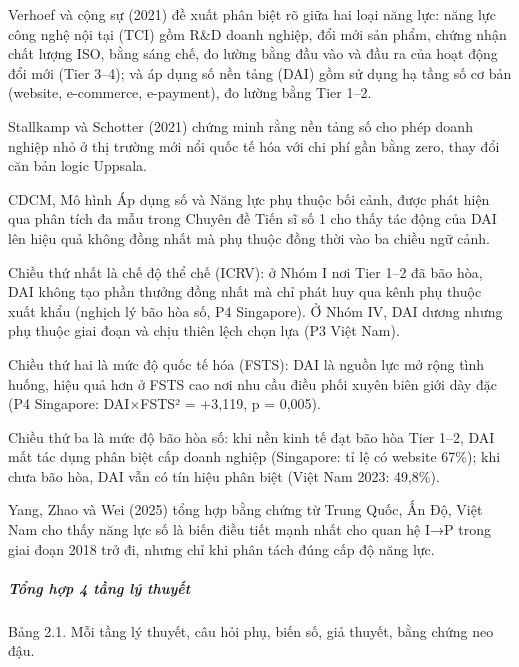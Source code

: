 \documentclass[12pt,a4paper]{article}
\begin{document}
Verhoef và cộng sự (2021) đề xuất phân biệt rõ giữa hai loại năng lực:
năng lực công nghệ nội tại (TCI) gồm R\&D doanh nghiệp, đổi mới sản
phẩm, chứng nhận chất lượng ISO, bằng sáng chế, đo lường bằng đầu vào và
đầu ra của hoạt động đổi mới (Tier 3--4); và áp dụng số nền tảng (DAI)
gồm sử dụng hạ tầng số cơ bản (website, e-commerce, e-payment), đo lường
bằng Tier 1--2.

Stallkamp và Schotter (2021) chứng minh rằng nền tảng số cho phép doanh
nghiệp nhỏ ở thị trường mới nổi quốc tế hóa với chi phí gần bằng zero,
thay đổi căn bản logic Uppsala.

CDCM, Mô hình Áp dụng số và Năng lực phụ thuộc bối cảnh, được phát hiện
qua phân tích đa mẫu trong Chuyên đề Tiến sĩ số 1 cho thấy tác động của
DAI lên hiệu quả không đồng nhất mà phụ thuộc đồng thời vào ba chiều ngữ
cảnh.

Chiều thứ nhất là chế độ thể chế (ICRV): ở Nhóm I nơi Tier 1--2 đã bão
hòa, DAI không tạo phần thưởng đồng nhất mà chỉ phát huy qua kênh phụ
thuộc xuất khẩu (nghịch lý bão hòa số, P4 Singapore). Ở Nhóm IV, DAI
dương nhưng phụ thuộc giai đoạn và chịu thiên lệch chọn lựa (P3 Việt
Nam).

Chiều thứ hai là mức độ quốc tế hóa (FSTS): DAI là nguồn lực mở rộng
tình huống, hiệu quả hơn ở FSTS cao nơi nhu cầu điều phối xuyên biên
giới dày đặc (P4 Singapore: DAI×FSTS² = +3,119, p = 0,005).

Chiều thứ ba là mức độ bão hòa số: khi nền kinh tế đạt bão hòa Tier
1--2, DAI mất tác dụng phân biệt cấp doanh nghiệp (Singapore: tỉ lệ có
website 67\%); khi chưa bão hòa, DAI vẫn có tín hiệu phân biệt (Việt Nam
2023: 49,8\%).

Yang, Zhao và Wei (2025) tổng hợp bằng chứng từ Trung Quốc, Ấn Độ, Việt
Nam cho thấy năng lực số là biến điều tiết mạnh nhất cho quan hệ I→P
trong giai đoạn 2018 trở đi, nhưng chỉ khi phân tách đúng cấp độ năng
lực.

\hypertarget{tux1ed5ng-hux1ee3p-4-tux1ea7ng-luxfd-thuyux1ebft}{%
\subparagraph{Tổng hợp 4 tầng lý
thuyết}\label{tux1ed5ng-hux1ee3p-4-tux1ea7ng-luxfd-thuyux1ebft}}

Bảng 2.1. Mỗi tầng lý thuyết, câu hỏi phụ, biến số, giả thuyết, bằng
chứng neo đậu.
\end{document}
